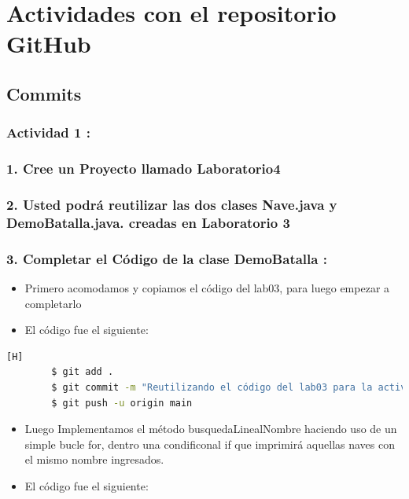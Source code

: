 \documentclass{article}
\begin{document}
	\section{Actividades con el repositorio GitHub}
        
        

    \subsection{Commits}
    \subsubsection{Actividad 1 : \\\\
        1. Cree un Proyecto llamado Laboratorio4\\\\
        2. Usted podrá reutilizar las dos clases Nave.java y DemoBatalla.java. creadas en Laboratorio 3\\\\
        3. Completar el Código de la clase DemoBatalla :}


    
    \begin{itemize}	
        \item Primero acomodamos y copiamos el código del lab03, para luego empezar a completarlo
	\item El código fue el siguiente:
    \end{itemize}
    
    
    \begin{lstlisting}[language=bash,caption={Commit: Reutilizando el código del lab03 para la actividad}][H]
		$ git add .
		$ git commit -m "Reutilizando el código del lab03 para la actividad"			
		$ git push -u origin main
	\end{lstlisting}


     \begin{itemize}	
        \item Luego Implementamos el método busquedaLinealNombre haciendo uso de un simple bucle for, dentro una condificonal if que imprimirá aquellas naves con el mismo nombre ingresados.
	\item El código fue el siguiente:
    \end{itemize}
    
    
\end{document}
